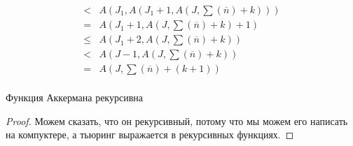 \begin{itemize}
\begin{enumerate}
\begin{enumerate}
\begin{align*}
< {}&A(J_1, A(J_1 + 1, A(J, \sum(\overline n) + k))) \tag{По строгой монотонности $(J_1 > 2)$}\\
= {}&A(J_1 + 1, A(J, \sum(\overline n) + k) + 1) \tag{По 3-му свойству ф-ии Аккерманна}\\
\leq {}&A(J_1 + 2, A(J, \sum(\overline n) + k))\\
< {}&A(J - 1, A(J, \sum(\overline n) + k)) \tag{По монот. $J > \max(..) + 4$}\\
= {}&A(J, \sum(\overline n) + (k + 1)) \tag{По 3-му свойству ф-ии Аккерманна, $J != 0$}\\
\end{align*}
\end{enumerate}
\end{enumerate}
\end{itemize}
\begin{theorem}
Функция Аккермана рекурсивна
\end{theorem}
\begin{proof}
Можем сказать, что он рекурсивный, потому что мы можем
его написать на компуктере, а тьюринг выражается в рекурсивных функциях.
\end{proof}

